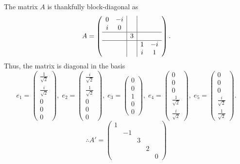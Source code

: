 \item

The matrix $A$ is thankfully block-diagonal as
\[
    A = \left(\begin{array}{cc|c|cc}
        0 & -i &   &   &    \\
        i & 0  &   &   &    \\
        \hline
          &    & 3 &   &    \\
        \hline
          &    &   & 1 & -i \\
          &    &   & i &  1
    \end{array}\right).
\]
Thus, the matrix is diagonal in the basis
\[
    e_1 = \begin{pmatrix}
        \frac{1}{\sqrt{2}} \\
        \frac{i}{\sqrt{2}} \\
        0 \\ 0 \\ 0
    \end{pmatrix},\;
    e_2 = \begin{pmatrix}
        \frac{i}{\sqrt{2}} \\
        \frac{1}{\sqrt{2}} \\
        0 \\ 0 \\ 0
    \end{pmatrix},\;
    e_3 = \begin{pmatrix}
        0 \\ 0 \\ 1 \\ 0 \\ 0
    \end{pmatrix},\;
    e_4 = \begin{pmatrix}
        0 \\ 0 \\ 0 \\
        \frac{1}{\sqrt{2}} \\
        \frac{i}{\sqrt{2}}
    \end{pmatrix},\;
    e_5 = \begin{pmatrix}
        0 \\ 0 \\ 0 \\
        \frac{i}{\sqrt{2}} \\
        \frac{1}{\sqrt{2}}
    \end{pmatrix}.
\]
\[
    \therefore A' = \begin{pmatrix}
        1 &    &   &   &   \\
          & -1 &   &   &   \\
          &    & 3 &   &   \\
          &    &   & 2 &   \\
          &    &   &   & 0
    \end{pmatrix}
\]

